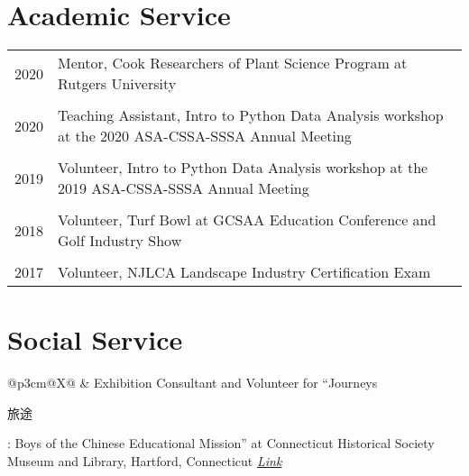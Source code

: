 \documentclass[letterpaper,11pt, english]{article}
\begin{document}
\section{Academic Service}
\begin{flushleft}
  \begin{tabularx}{\textwidth}{@{}lX@{}}
      2020 \hspace{1cm} & Mentor, Cook Researchers of Plant Science Program at Rutgers University \\
      \\[-0.2cm] 
      2020 \hspace{1cm} & Teaching Assistant, Intro to Python Data Analysis workshop at the 2020 ASA-CSSA-SSSA Annual Meeting \\
      \\[-0.2cm] 
      2019 \hspace{1cm} & Volunteer, Intro to Python Data Analysis workshop at the 2019 ASA-CSSA-SSSA Annual Meeting \\
      \\[-0.2cm] 
      2018 \hspace{1cm} & Volunteer, Turf Bowl at GCSAA Education Conference and Golf Industry Show \\
      \\[-0.2cm] 
      2017 \hspace{1cm} & Volunteer, NJLCA Landscape Industry Certification Exam \\
  \end{tabularx}
\end{flushleft}

\section{Social Service}
\begin{flushleft}
  \begin{tabularx}{\textwidth}{@{}p{3cm}@{\hspace{0.01cm}}X@{}}
     & Exhibition Consultant and Volunteer for “Journeys \begin{CJK*}{UTF8}{gbsn}旅途\end{CJK*}: Boys of the Chinese Educational Mission” at Connecticut Historical Society Museum and Library, Hartford, Connecticut \emph{\href{https://chs.org/exhibition/journeys/ }{\color{blue}Link}}\\
  \end{tabularx}
\end{flushleft}
\end{document}
